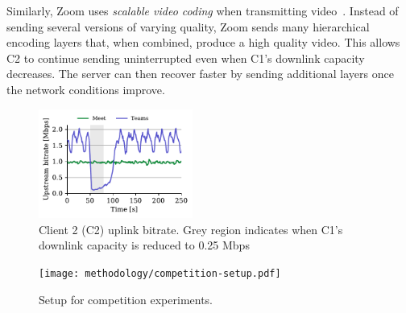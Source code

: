 Similarly, Zoom uses \textit{scalable video coding} when transmitting
video~\cite{zoom_encoding}. Instead of sending several versions of varying
quality, Zoom sends many hierarchical encoding layers that, when combined,
produce a high quality video. This allows C2 to continue sending uninterrupted
even when C1's downlink capacity decreases. The server can then recover faster
by sending additional layers once the network conditions improve. 

\begin{figure}[t]
    \centering
    \includegraphics[width=0.45\textwidth,keepaspectratio]{../figures/interrupt/Interrupt-sender.pdf}
    \caption{Client 2 (C2) uplink bitrate. Grey region indicates when C1's downlink capacity is reduced to 0.25 Mbps}
    \label{fig:interrupt-sender}
\end{figure}

\begin{figure}[]
   \centering
    \texttt{[image: methodology/competition-setup.pdf]}
    \caption{Setup for competition experiments.}
    \label{fig:competition-setup}
\end{figure}

